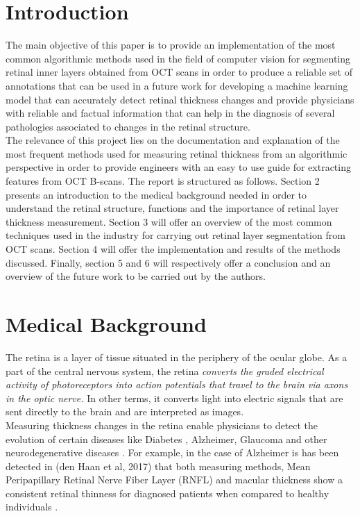 \documentclass[12pt,a4paper]{scrartcl}
\begin{document}
\section{Introduction}\label{s:introduction}
The main objective of this paper is to provide an implementation of the most common algorithmic methods used in the field of computer vision for segmenting retinal inner layers obtained from OCT scans in order to produce a reliable set of annotations that can be used in a future work for developing a machine learning model that can accurately detect retinal thickness changes and provide physicians with reliable and factual information that can help in the diagnosis of several pathologies associated to changes in the retinal structure. \\

The relevance of this project lies on the documentation and explanation of the most frequent methods used for measuring retinal thickness from an algorithmic perspective in order to provide engineers with an easy to use guide for extracting features from OCT B-scans. The report is structured as follows. Section 2 presents an introduction to the medical background needed in order to understand the retinal structure, functions and the importance of retinal layer thickness measurement. Section 3 will offer an overview of the most common techniques used in the industry for carrying out retinal layer segmentation from OCT scans. Section 4 will offer the implementation and results of the methods discussed. Finally, section 5 and 6 will respectively offer a conclusion and an overview of the future work to be carried out by the authors. \\

\section{Medical Background}\label{s:medical_background}

The retina is a layer of tissue situated in the periphery of the ocular globe. As a part of the central nervous system, the retina \textit{converts the graded electrical activity of photoreceptors into action potentials that travel to the brain via axons in the optic nerve.}\cite{purves2001} In other terms, it converts light into electric signals that are sent directly to the brain and are interpreted as images. \\

Measuring thickness changes in the retina enable physicians to detect the evolution of certain diseases like Diabetes \cite{Jiang2018}, Alzheimer, Glaucoma and other neurodegenerative diseases \cite{DENHAAN2017162}. For example, in the case of Alzheimer is has been detected in (den Haan et al, 2017) that both measuring methods, Mean Peripapillary Retinal Nerve Fiber Layer (RNFL) and macular thickness show a consistent retinal thinness for diagnosed patients when compared to healthy individuals \cite{DENHAAN2017162}.\\
\end{document}
